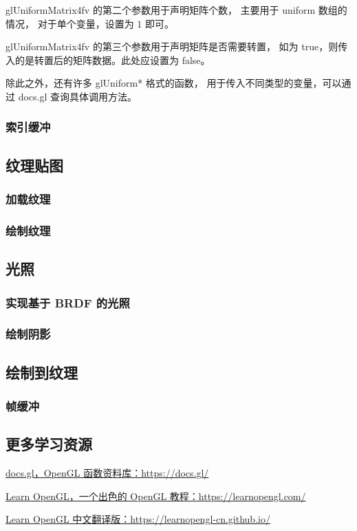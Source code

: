 \documentclass[fontset=windows]{ctexart}
\begin{document}
glUniformMatrix4fv 的第二个参数用于声明矩阵个数，
主要用于 uniform 数组的情况，
对于单个变量，设置为 $1$ 即可。

glUniformMatrix4fv 的第三个参数用于声明矩阵是否需要转置，
如为 true，则传入的是转置后的矩阵数据。此处应设置为 false。

除此之外，还有许多 glUniform* 格式的函数，
用于传入不同类型的变量，可以通过 docs.gl 查询具体调用方法。

\subsubsection{索引缓冲}

\subsection{纹理贴图}

\subsubsection{加载纹理}

\subsubsection{绘制纹理}

\subsection{光照}

\subsubsection{实现基于 BRDF 的光照}

\subsubsection{绘制阴影}

\subsection{绘制到纹理}

\subsubsection{帧缓冲}

\subsection{更多学习资源}

\label{sec-gl:study-resources}

\href{https://docs.gl}{docs.gl，OpenGL 函数资料库：https://docs.gl/}

\href{https://learnopengl.com/}{Learn OpenGL，一个出色的 OpenGL 教程：https://learnopengl.com/}

\href{https://learnopengl-cn.github.io/}{Learn OpenGL 中文翻译版：https://learnopengl-cn.github.io/}
\end{document}

